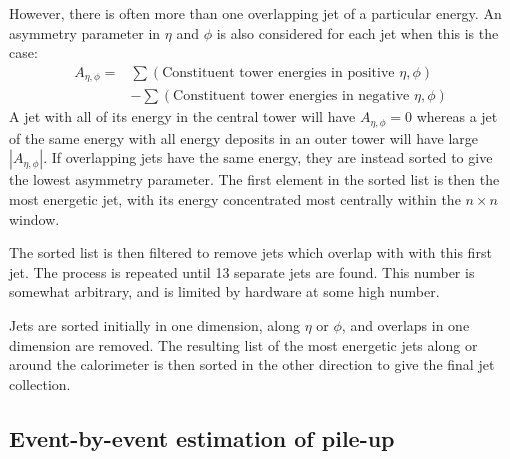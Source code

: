 However, there is often more than one overlapping jet of a particular energy. 
An asymmetry parameter in $\eta$ and $\phi$ is also considered for each jet when this is the case:
\begin{equation}
 \begin{split}
 A_{\eta, \phi} = & \sum \left( \text{Constituent tower energies in positive } \eta , \phi \right) \\ & - \sum \left( \text{Constituent tower energies in negative } \eta, \phi \right) 
 \end{split}
\label{eqn:Asym}
\end{equation}
A jet with all of its energy in the central tower will have $A_{\eta, \phi} = 0$ 
whereas a jet of the same energy with all energy deposits in an outer tower
 will have large $|A_{\eta, \phi}|$. 
If overlapping jets have the same energy, they are instead sorted 
to give the lowest asymmetry parameter.
The first element in the sorted list is then the most energetic jet, with its energy concentrated most centrally within the $n\times n$ window.

 The sorted list is then filtered to remove jets which overlap with with this first jet.
 The process is repeated until 13 separate jets are found. 
 This number is somewhat arbitrary, and is limited by hardware at some high number.
 
Jets are sorted initially in one dimension, along $\eta$ or $\phi$, and overlaps in one dimension are removed. 
The resulting list of the most energetic jets along or around the calorimeter is then sorted in the other direction to give the final jet collection.


\subsection{Event-by-event estimation of pile-up} 

